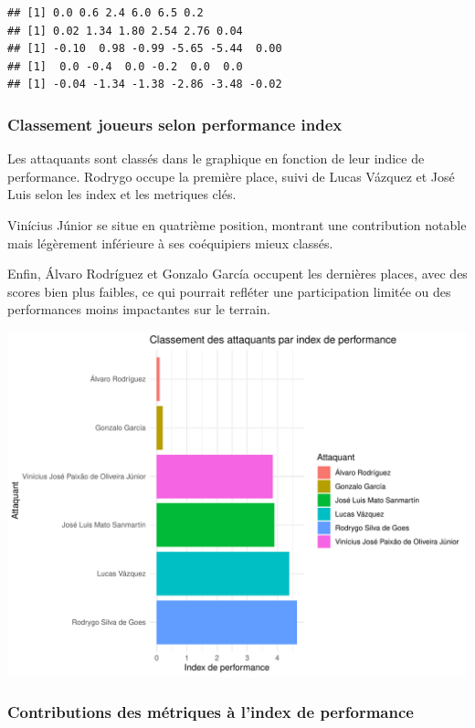 \documentclass[
  6pt,
]{article}
\begin{document}
\begin{verbatim}
## [1] 0.0 0.6 2.4 6.0 6.5 0.2
## [1] 0.02 1.34 1.80 2.54 2.76 0.04
## [1] -0.10  0.98 -0.99 -5.65 -5.44  0.00
## [1]  0.0 -0.4  0.0 -0.2  0.0  0.0
## [1] -0.04 -1.34 -1.38 -2.86 -3.48 -0.02
\end{verbatim}

\subsubsection{Classement joueurs selon performance
index}\label{classement-joueurs-selon-performance-index}

Les attaquants sont classés dans le graphique en fonction de leur indice
de performance. Rodrygo occupe la première place, suivi de Lucas Vázquez
et José Luis selon les index et les metriques clés.

Vinícius Júnior se situe en quatrième position, montrant une
contribution notable mais légèrement inférieure à ses coéquipiers mieux
classés.

Enfin, Álvaro Rodríguez et Gonzalo García occupent les dernières places,
avec des scores bien plus faibles, ce qui pourrait refléter une
participation limitée ou des performances moins impactantes sur le
terrain.

\begin{center}\includegraphics[width=0.8\linewidth]{Analyse_Impact_Performances_Joueurs_files/figure-latex/classeemnt-forwards-1} \end{center}

\subsubsection{Contributions des métriques à l'index de
performance}\label{contributions-des-muxe9triques-uxe0-lindex-de-performance}
\end{document}
